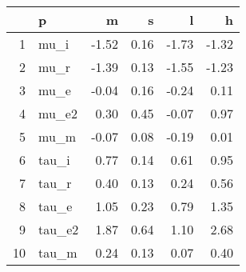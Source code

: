 \begin{table}[ht]
\centering
\begin{tabular}{rlrrrr}
  \hline
 & p & m & s & l & h \\ 
  \hline
1 & mu\_i & -1.52 & 0.16 & -1.73 & -1.32 \\ 
  2 & mu\_r & -1.39 & 0.13 & -1.55 & -1.23 \\ 
  3 & mu\_e & -0.04 & 0.16 & -0.24 & 0.11 \\ 
  4 & mu\_e2 & 0.30 & 0.45 & -0.07 & 0.97 \\ 
  5 & mu\_m & -0.07 & 0.08 & -0.19 & 0.01 \\ 
  6 & tau\_i & 0.77 & 0.14 & 0.61 & 0.95 \\ 
  7 & tau\_r & 0.40 & 0.13 & 0.24 & 0.56 \\ 
  8 & tau\_e & 1.05 & 0.23 & 0.79 & 1.35 \\ 
  9 & tau\_e2 & 1.87 & 0.64 & 1.10 & 2.68 \\ 
  10 & tau\_m & 0.24 & 0.13 & 0.07 & 0.40 \\ 
   \hline
\end{tabular}
\label{tab:param}
\end{table}
